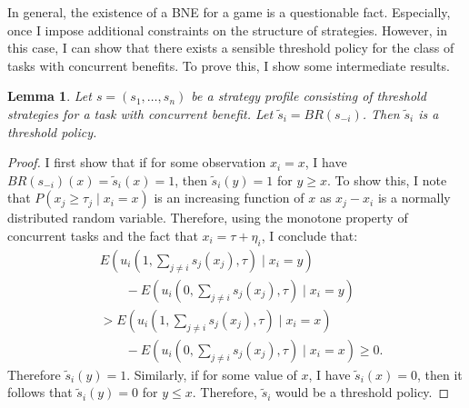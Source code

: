 \documentclass[defaultstyle,12pt]{proposal}
\newtheorem{lemma}{Lemma}
\begin{document}
In general, the existence of a BNE for a game is a questionable fact. Especially, once I impose additional constraints on the structure of strategies. However, in this case, I can show that there exists a sensible threshold policy for the class of tasks with concurrent benefits. To prove this, I show some intermediate results. 
\begin{lemma}\label{lemma:thresholdBR}
Let $s=(s_1,\ldots,s_n)$ be a strategy profile consisting of threshold strategies for a task with concurrent benefit. Let $\tilde{s}_i=BR(s_{-i})$. Then $\tilde{s}_i$ is a threshold policy. 
\end{lemma}
\begin{proof}
I first show that if for some observation $x_i=x$, I have $BR(s_{-i})(x)=\tilde{s}_i(x)=1$, then $\tilde{s}_i(y)=1$ for $y\geq x$. To show this,  I note that $P(x_j\geq \tau_j\mid x_i=x)$ is an increasing function of $x$ as $x_j-x_i$ is a normally distributed random variable. Therefore, using the monotone property of concurrent tasks and the fact that $x_i=\tau+\eta_i$, I conclude that:
\vspace{-5px}
\begin{align*}
&E(u_i(1,\sum_{j\not=i}s_j(x_j),\tau)\mid x_i=y)\\ 
&\qquad-E(u_i(0,\sum_{j\not=i}s_j(x_j),\tau)\mid x_i=y)\\ 
&>E(u_i(1,\sum_{j\not=i}s_j(x_j),\tau)\mid x_i=x)\\
&\qquad-E(u_i(0,\sum_{j\not=i}s_j(x_j),\tau)\mid x_i=x)\geq 0.
\end{align*}
Therefore $\tilde{s}_i(y)=1$. Similarly, if for some value of $x$, I have $\tilde{s}_i(x)=0$, then it follows that $\tilde{s}_i(y)=0$ for $y\leq x$. Therefore, $\tilde{s}_i$ would be a threshold policy.  
\end{proof}
\end{document}
